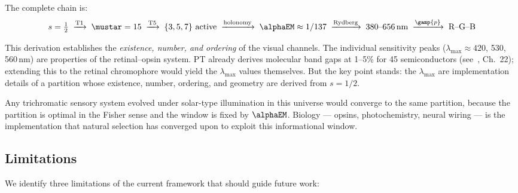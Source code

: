 \documentclass[12pt,a4paper]{article}
\begin{document}
The complete chain is:
\begin{equation}
  s = \tfrac{1}{2}
  \;\xrightarrow{\text{T1}}\;
  \mustar = 15
  \;\xrightarrow{\text{T5}}\;
  \{3,5,7\} \text{ active}
  \;\xrightarrow{\text{holonomy}}\;
  \alphaEM \approx 1/137
  \;\xrightarrow{\text{Rydberg}}\;
  380\text{--}656\,\text{nm}
  \;\xrightarrow{\gamp{p}}\;
  \text{R--G--B}
  \label{eq:chain}
\end{equation}

\begin{remark}
This derivation establishes the \emph{existence, number, and
ordering} of the visual channels. The individual sensitivity peaks
($\lambda_{\max} \approx 420$, 530, 560\,nm) are properties of the
retinal--opsin system. PT already derives molecular band gaps at
1--5\% for 45 semiconductors (see~\cite{senez2026math}, Ch.~22);
extending this to the retinal chromophore would yield the
$\lambda_{\max}$ values themselves. But the key point stands: the
$\lambda_{\max}$ are implementation details of a partition whose
existence, number, ordering, and geometry are derived from $s = 1/2$.
\end{remark}

\begin{remark}
Any trichromatic sensory system evolved under solar-type illumination
in this universe would converge to the same partition, because the
partition is optimal in the Fisher sense and the window is fixed by
$\alphaEM$. Biology --- opsins, photochemistry, neural wiring --- is
the implementation that natural selection has converged upon to
exploit this informational window.
\end{remark}

\subsection{Limitations}

We identify three limitations of the current framework that should
guide future work:
\end{document}
